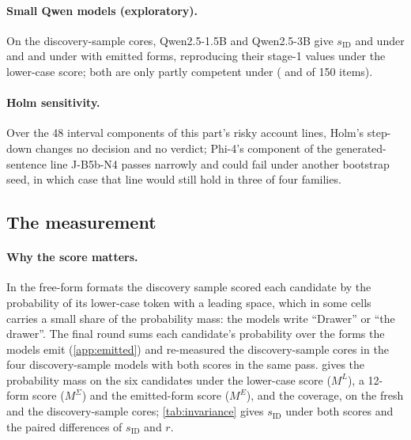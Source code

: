\paragraph{Small Qwen models (exploratory).} On the discovery-sample cores, Qwen2.5-1.5B and Qwen2.5-3B give $s_{\mathrm{ID}}$ \JbXtwoSidAfterQwenOnefive{} and \JbXtwoSidAfterQwenThree{} under \fmtListA{} and \JbXtwoSidPostQwenOnefive{} and \JbXtwoSidPostQwenThree{} under \fmtPost{} with emitted forms, reproducing their stage-1 values under the lower-case score; both are only partly competent under \fmtPost{} (\JbXtwoCompPostQwenOnefive{} and \JbXtwoCompPostQwenThree{} of 150 items).

\paragraph{Holm sensitivity.} Over the 48 interval components of this part's risky account lines, Holm's step-down changes no decision and no verdict; Phi-4's component of the generated-sentence line J-B5b-N4 passes narrowly and could fail under another bootstrap seed, in which case that line would still hold in three of four families. %

\subsection{The measurement}\label{app:measure}

\paragraph{Why the score matters.} In the free-form formats the discovery sample scored each candidate by the probability of its lower-case token with a leading space, which in some cells carries a small share of the probability mass: the models write ``Drawer'' or ``the drawer''. The final round sums each candidate's probability over the forms the models emit (\cref{app:emitted}) and re-measured the discovery-sample cores in the four discovery-sample models with both scores in the same pass.  gives the probability mass on the six candidates under the lower-case score ($M^L$), a 12-form score ($M^\Sigma$) and the emitted-form score ($M^E$), and the coverage, on the fresh and the discovery-sample cores; \cref{tab:invariance} gives $s_{\mathrm{ID}}$ under both scores and the paired differences of $s_{\mathrm{ID}}$ and $r$.

\begin{table}[!ht]
\centering
\scriptsize
\caption{\textbf{Probability mass on the candidates, by score.} $M^L$, $M^\Sigma$, $M^E$: mean over items of the clean base run's mass on the six candidates under the lower-case score, the 12-form score and the emitted-form score; coverage: the smallest mean $M^E$ over a cell's sixteen clamp and clean rows. F: fresh cores; S0: the discovery-sample cores (arms as in \cref{tab:fresh}, with \fmtOpt{}).}
\label{tab:mass}
\scalebox{0.88}{\setlength{\tabcolsep}{4pt}}
\end{table}

